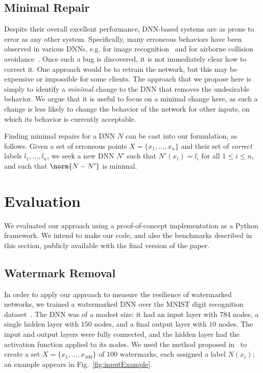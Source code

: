\documentclass{easychair}
\newcommand{\relu}{\text{ReLU}\xspace{}}
\begin{document}
\subsection{Minimal Repair}
Despite their overall excellent performance, DNN-based systems are as
prone to error as any other system. Specifically, many erroneous
behaviors have been observed in various DNNs, e.g. for image
recognition~\cite{EyEvFeLiRaXiPrKo18,SzZaSuBrErGoFe13} and for airborne collision
avoidance~\cite{JuLoBrOwKo16,KaBaDiJuKo17Reluplex}. Once such a bug is
discovered, it is not immediately clear how to correct it. One
approach would be to retrain the network, but this may be expensive
or impossible for some clients. The approach that we propose here is
simply to identify a \emph{minimal} change to the DNN that removes the
undesirable behavior. We argue that it is useful to focus on a minimal
change here, as such a change is less likely to change the behavior of
the network for other inputs, on which its behavior is currently acceptable.

Finding minimal repairs for a DNN $N$ can be cast into our
formulation, as follows. Given a set of erroneous points
$X=\{x_1,\ldots,x_n\}$ and their set of \emph{correct} labels
$l_1,\ldots,l_n$, we seek a new DNN $N'$ such that $N'(x_i)=l_i$ for
all $1\leq i \leq n$, and such that 
 $\norm{N-N'}$ is minimal. 

\section{Evaluation}
\label{sec:evaluation}

We evaluated our approach using a proof-of-concept implementation
as a Python framework. We intend to make our code, and also the
benchmarks described in this section, publicly available with the
final version of the paper.


\subsection{Watermark Removal}

In order to apply our approach to measure the resilience of
watermarked networks, we trained a watermarked DNN over the MNIST
digit recognition dataset~\cite{mnist}. The DNN was of a modest size:
it had an input layer with 784 nodes, a single hidden layer with $150$
nodes, and a final output layer with $10$ nodes. The input and output layers were fully
connected, and the hidden layer had the \relu{} activation function
applied to its nodes. We used the
method proposed in~\cite{AdBaPiKeWatermarking} to create a set
$X=\{x_1,\ldots, x_{100}\}$ of $100$ watermarks, each assigned a label
$N(x_i)$; an example appears in Fig.~\ref{fig:inputExample}.
\end{document}
